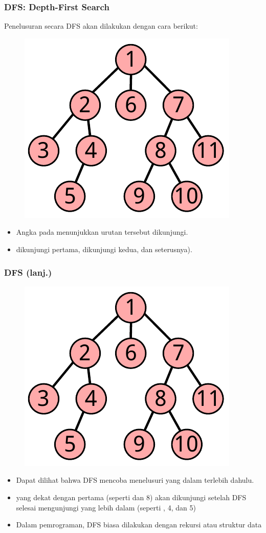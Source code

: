 \begin{frame}
\frametitle{DFS: Depth-First Search}
Penelusuran secara DFS akan dilakukan dengan cara berikut:
\begin{figure}
  \centering
  \includegraphics[width=4 cm]{asset/dfs.pdf}
\end{figure}
\begin{itemize}
  \item Angka pada \fnode menunjukkan urutan \fnode tersebut dikunjungi.
  \item {} dikunjungi pertama,  dikunjungi kedua, dan seterusnya).
\end{itemize}
\end{frame}

\begin{frame}
\frametitle{DFS (lanj.)}
\begin{figure}
  \centering
  \includegraphics[width=4 cm]{asset/dfs.pdf}
\end{figure}
\begin{itemize}
  \item Dapat dilihat bahwa DFS mencoba menelusuri \fnode yang dalam terlebih dahulu.
  \item \fNode yang dekat dengan \fnode pertama (seperti  dan 8) akan dikunjungi setelah DFS selesai mengunjungi \fnode yang lebih dalam (seperti , 4, dan 5)
  \item Dalam pemrograman, DFS biasa dilakukan dengan rekursi atau struktur data 
\end{itemize}
\end{frame}



